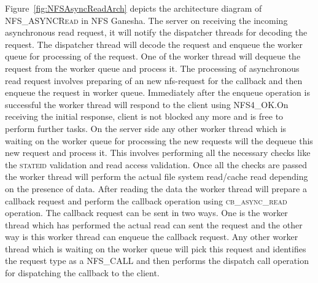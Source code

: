  Figure~\ref{fig:NFSAsyncReadArch} depicts the architecture diagram of \textsc{NFS\_ASYNCRead} in NFS Ganesha. The server on receiving the incoming asynchronous read request, it will notify the dispatcher threads for decoding the request. The dispatcher thread will decode the request and enqueue the worker queue for processing of the request. One of the worker thread will dequeue the request from the worker queue and process it. The processing of asynchronous read request involves preparing of an new nfs-request for the callback and then enqueue the request in worker queue. Immediately after the enqueue operation is successful the worker thread will respond to the client using \textsc{NFS4\_OK}.On receiving the initial response, client is not blocked any more and is free to perform further tasks. On the server side any other worker thread which is waiting on the worker queue for processing the new requests will the dequeue this new request and process it. This involves performing all the necessary checks like the \textsc{stateid} validation and read access validation. Once all the checks are passed the worker thread will perform the actual file system read/cache read depending on the presence of data. After reading the data the worker thread will prepare a callback request and perform the callback operation using \textsc{cb\_async\_read} operation. The callback request can be sent in two ways. One is the worker thread which has performed the actual read can sent the request and the other way is this worker thread can enqueue the callback request. Any other worker thread which is waiting on the worker queue will pick this request and identifies the request type as a \textsc{NFS\_CALL} and then performs the dispatch call operation for dispatching the callback to the client. 
 
 






 
 
 








